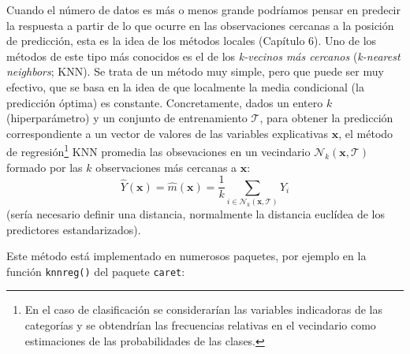\documentclass[]{book}
\theoremstyle{break}
\theoremstyle{definition}
\theoremstyle{definition}
\theoremstyle{definition}
\theoremstyle{remark}
\begin{document}
Cuando el número de datos es más o menos grande podríamos pensar en
predecir la respuesta a partir de lo que ocurre en las observaciones
cercanas a la posición de predicción, esta es la idea de los métodos
locales (Capítulo 6). Uno de los métodos de este tipo más conocidos es
el de los \emph{k-vecinos más cercanos} (\emph{k-nearest neighbors};
KNN). Se trata de un método muy simple, pero que puede ser muy efectivo,
que se basa en la idea de que localmente la media condicional (la
predicción óptima) es constante. Concretamente, dados un entero \(k\)
(hiperparámetro) y un conjunto de entrenamiento \(\mathcal{T}\), para
obtener la predicción correspondiente a un vector de valores de las
variables explicativas \(\mathbf{x}\), el método de regresión\footnote{En
  el caso de clasificación se considerarían las variables indicadoras de
  las categorías y se obtendrían las frecuencias relativas en el
  vecindario como estimaciones de las probabilidades de las clases.} KNN
promedia las obsevaciones en un vecindario
\(\mathcal{N}_k(\mathbf{x}, \mathcal{T})\) formado por las \(k\)
observaciones más cercanas a \(\mathbf{x}\):
\[\hat{Y}(\mathbf{x}) = \hat{m}(\mathbf{x}) = \frac{1}{k} \sum_{i \in \mathcal{N}_k(\mathbf{x}, \mathcal{T})} Y_i\]
(sería necesario definir una distancia, normalmente la distancia
euclídea de los predictores estandarizados).

Este método está implementado en numerosos paquetes, por ejemplo en la
función \texttt{knnreg()} del paquete \texttt{caret}:
\end{document}
